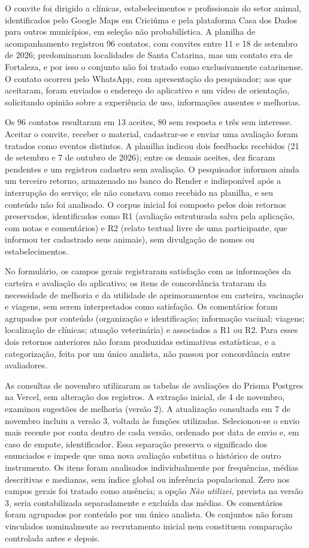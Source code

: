 \documentclass{UNESC}
\begin{document}
O convite foi dirigido a clínicas, estabelecimentos e profissionais do setor animal, identificados pelo Google Maps em Criciúma e pela plataforma Casa dos Dados para outros municípios, em seleção não probabilística. A planilha de acompanhamento registrou 96 contatos, com convites entre 11 e 18 de setembro de 2026; predominaram localidades de Santa Catarina, mas um contato era de Fortaleza, e por isso o conjunto não foi tratado como exclusivamente catarinense. O contato ocorreu pelo WhatsApp, com apresentação do pesquisador; aos que aceitaram, foram enviados o endereço do aplicativo e um vídeo de orientação, solicitando opinião sobre a experiência de uso, informações ausentes e melhorias.

Os 96 contatos resultaram em 13 aceites, 80 sem resposta e três sem interesse. Aceitar o convite, receber o material, cadastrar-se e enviar uma avaliação foram tratados como eventos distintos. A planilha indicou dois feedbacks recebidos (21 de setembro e 7 de outubro de 2026); entre os demais aceites, dez ficaram pendentes e um registrou cadastro sem avaliação. O pesquisador informou ainda um terceiro retorno, armazenado no banco do Render e indisponível após a interrupção do serviço; ele não constava como recebido na planilha, e seu conteúdo não foi analisado. O corpus inicial foi composto pelos dois retornos preservados, identificados como R1 (avaliação estruturada salva pela aplicação, com notas e comentários) e R2 (relato textual livre de uma participante, que informou ter cadastrado seus animais), sem divulgação de nomes ou estabelecimentos.

No formulário, os campos gerais registraram satisfação com as informações da carteira e avaliação do aplicativo; os itens de concordância trataram da necessidade de melhoria e da utilidade de aprimoramentos em carteira, vacinação e viagens, sem serem interpretados como satisfação. Os comentários foram agrupados por conteúdo (organização e identificação; informação vacinal; viagens; localização de clínicas; atuação veterinária) e associados a R1 ou R2. Para esses dois retornos anteriores não foram produzidas estimativas estatísticas, e a categorização, feita por um único analista, não passou por concordância entre avaliadores.

As consultas de novembro utilizaram as tabelas de avaliações do Prisma Postgres na Vercel, sem alteração dos registros. A extração inicial, de 4 de novembro, examinou sugestões de melhoria (versão 2). A atualização consultada em 7 de novembro incluiu a versão 3, voltada às funções utilizadas. Selecionou-se o envio mais recente por conta dentro de cada versão, ordenado por data de envio e, em caso de empate, identificador. Essa separação preserva o significado dos enunciados e impede que uma nova avaliação substitua o histórico de outro instrumento. Os itens foram analisados individualmente por frequências, médias descritivas e medianas, sem índice global ou inferência populacional. Zero nos campos gerais foi tratado como ausência; a opção \textit{Não utilizei}, prevista na versão 3, seria contabilizada separadamente e excluída das médias. Os comentários foram agrupados por conteúdo por um único analista. Os conjuntos não foram vinculados nominalmente ao recrutamento inicial nem constituem comparação controlada antes e depois.
\end{document}

